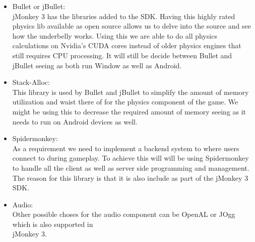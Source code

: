 \documentclass[letterpaper]{article}
\begin{document}
			\begin{itemize}
				\item Bullet or jBullet: \\
					jMonkey 3 has the libraries added to the SDK. Having this highly rated physics lib available as open source allows us to delve into the source and see how the underbelly works. Using this we are able to do all physics calculations on Nvidia's CUDA cores instead of older physics engines that still requires CPU processing. It will still be decide between Bullet and jBullet seeing as both run Window as well as Android.
					
				\item Stack-Alloc: \\
					This library is used by Bullet and jBullet to simplify the amount of memory utilization and waist there of for the physics component of the game. We might be using this to decrease the required amount of memory seeing as it needs to run on Android devices as well.
				
				\item Spidermonkey:\\
					As a requirement we need to implement a backend system to where users connect to during gameplay. To achieve this will will be using Spidermonkey to handle all the client as well as server side programming and management. The reason for this library is that it is also include as part of the jMonkey 3 SDK.
				
				\item Audio: \\
					Other possible choses for the audio component can be OpenAL or JOgg which is also supported in \\ jMonkey 3.
									

\end{itemize}
\end{document}

